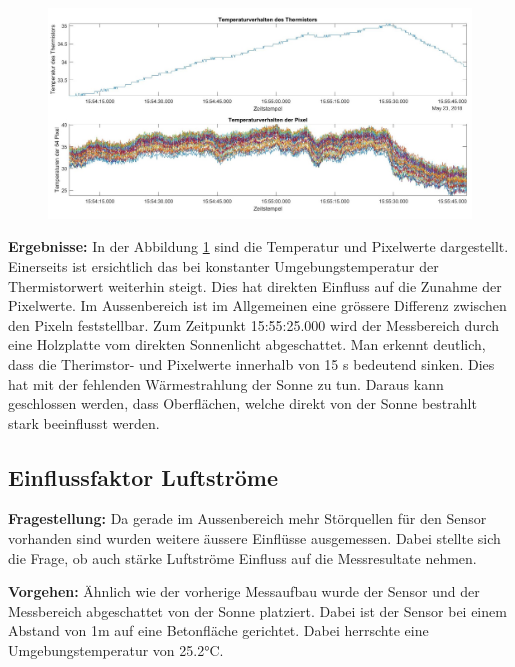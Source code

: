 \begin{figure}[H]
	\centering
	\includegraphics[width=1.0\textwidth]{fig/Temperaturverhalten2}
	\caption{}
	\label{fig:temperaturverhalten2}
\end{figure}

\textbf{Ergebnisse:} In der Abbildung \ref{fig:temperaturverhalten2} sind die Temperatur und Pixelwerte dargestellt. Einerseits ist ersichtlich das bei konstanter Umgebungstemperatur der Thermistorwert weiterhin steigt. Dies hat direkten Einfluss auf die Zunahme der Pixelwerte. Im Aussenbereich ist im Allgemeinen eine grössere Differenz zwischen den Pixeln feststellbar.
Zum Zeitpunkt 15:55:25.000 wird der Messbereich durch eine Holzplatte vom direkten Sonnenlicht abgeschattet. Man erkennt deutlich, dass die Therimstor- und Pixelwerte innerhalb von 15 s bedeutend sinken. Dies hat mit der fehlenden Wärmestrahlung der Sonne zu tun. Daraus kann geschlossen werden, dass Oberflächen, welche direkt von der Sonne bestrahlt stark beeinflusst werden.



\subsection{Einflussfaktor Luftströme}
\textbf{Fragestellung:} Da gerade im Aussenbereich mehr Störquellen für den Sensor vorhanden sind wurden weitere äussere Einflüsse ausgemessen. Dabei stellte sich die Frage, ob auch stärke Luftströme Einfluss auf die Messresultate nehmen.

\textbf{Vorgehen:} Ähnlich wie der vorherige Messaufbau wurde der Sensor und der Messbereich abgeschattet von der Sonne platziert. Dabei ist der Sensor bei einem Abstand von 1m auf eine Betonfläche gerichtet. Dabei herrschte eine Umgebungstemperatur von 25.2°C.  
	
